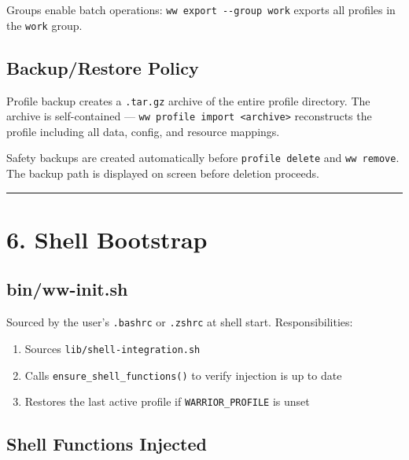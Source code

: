 \documentclass[
]{article}
\providecommand{\tightlist}{%
  \setlength{\itemsep}{0pt}\setlength{\parskip}{0pt}}
\begin{document}
Groups enable batch operations: \texttt{ww\ export\ -\/-group\ work}
exports all profiles in the \texttt{work} group.

\subsection{Backup/Restore Policy}\label{backuprestore-policy}

Profile backup creates a \texttt{.tar.gz} archive of the entire profile
directory. The archive is self-contained ---
\texttt{ww\ profile\ import\ \textless{}archive\textgreater{}}
reconstructs the profile including all data, config, and resource
mappings.

Safety backups are created automatically before \texttt{profile\ delete}
and \texttt{ww\ remove}. The backup path is displayed on screen before
deletion proceeds.

\begin{center}\rule{0.5\linewidth}{0.5pt}\end{center}

\section{6. Shell Bootstrap}\label{shell-bootstrap}

\subsection{bin/ww-init.sh}\label{binww-init.sh}

Sourced by the user's \texttt{.bashrc} or \texttt{.zshrc} at shell
start. Responsibilities:

\begin{enumerate}
\def\labelenumi{\arabic{enumi}.}
\tightlist
\item
  Sources \texttt{lib/shell-integration.sh}
\item
  Calls \texttt{ensure\_shell\_functions()} to verify injection is up to
  date
\item
  Restores the last active profile if \texttt{WARRIOR\_PROFILE} is unset
\end{enumerate}

\subsection{Shell Functions Injected}\label{shell-functions-injected}
\end{document}
